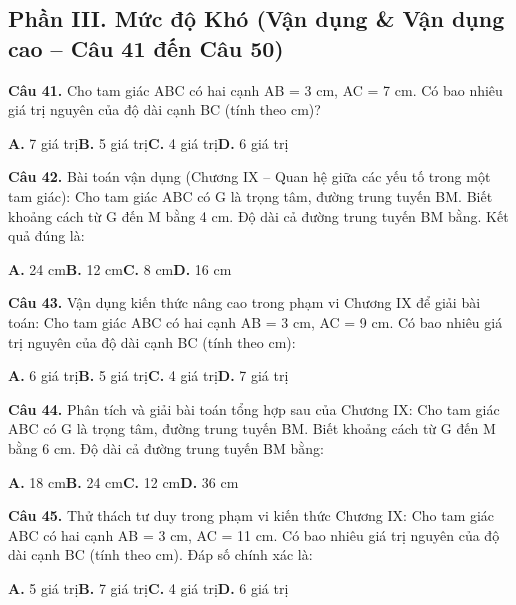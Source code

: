 \documentclass[11pt,a4paper]{article}
\begin{document}
\subsection*{\color{accent} Phần III. Mức độ Khó (Vận dụng \& Vận dụng cao -- Câu 41 đến Câu 50)}
\textbf{\color{primary} Câu 41.} Cho tam giác ABC có hai cạnh AB = 3 cm, AC = 7 cm. Có bao nhiêu giá trị nguyên của độ dài cạnh BC (tính theo cm)?\par
\hspace*{1.5em}\textbf{A.} 7 giá trị\quad\quad \textbf{B.} 5 giá trị\quad\quad \textbf{C.} 4 giá trị\quad\quad \textbf{D.} 6 giá trị\par\vspace{2pt}
\textbf{\color{primary} Câu 42.} Bài toán vận dụng (Chương IX – Quan hệ giữa các yếu tố trong một tam giác): Cho tam giác ABC có G là trọng tâm, đường trung tuyến BM. Biết khoảng cách từ G đến M bằng 4 cm. Độ dài cả đường trung tuyến BM bằng. Kết quả đúng là:\par
\hspace*{1.5em}\textbf{A.} 24 cm\quad\quad \textbf{B.} 12 cm\quad\quad \textbf{C.} 8 cm\quad\quad \textbf{D.} 16 cm\par\vspace{2pt}
\textbf{\color{primary} Câu 43.} Vận dụng kiến thức nâng cao trong phạm vi Chương IX để giải bài toán: Cho tam giác ABC có hai cạnh AB = 3 cm, AC = 9 cm. Có bao nhiêu giá trị nguyên của độ dài cạnh BC (tính theo cm):\par
\hspace*{1.5em}\textbf{A.} 6 giá trị\quad\quad \textbf{B.} 5 giá trị\quad\quad \textbf{C.} 4 giá trị\quad\quad \textbf{D.} 7 giá trị\par\vspace{2pt}
\textbf{\color{primary} Câu 44.} Phân tích và giải bài toán tổng hợp sau của Chương IX: Cho tam giác ABC có G là trọng tâm, đường trung tuyến BM. Biết khoảng cách từ G đến M bằng 6 cm. Độ dài cả đường trung tuyến BM bằng:\par
\hspace*{1.5em}\textbf{A.} 18 cm\quad\quad \textbf{B.} 24 cm\quad\quad \textbf{C.} 12 cm\quad\quad \textbf{D.} 36 cm\par\vspace{2pt}
\textbf{\color{primary} Câu 45.} Thử thách tư duy trong phạm vi kiến thức Chương IX: Cho tam giác ABC có hai cạnh AB = 3 cm, AC = 11 cm. Có bao nhiêu giá trị nguyên của độ dài cạnh BC (tính theo cm). Đáp số chính xác là:\par
\hspace*{1.5em}\textbf{A.} 5 giá trị\quad\quad \textbf{B.} 7 giá trị\quad\quad \textbf{C.} 4 giá trị\quad\quad \textbf{D.} 6 giá trị\par\vspace{2pt}
\end{document}
